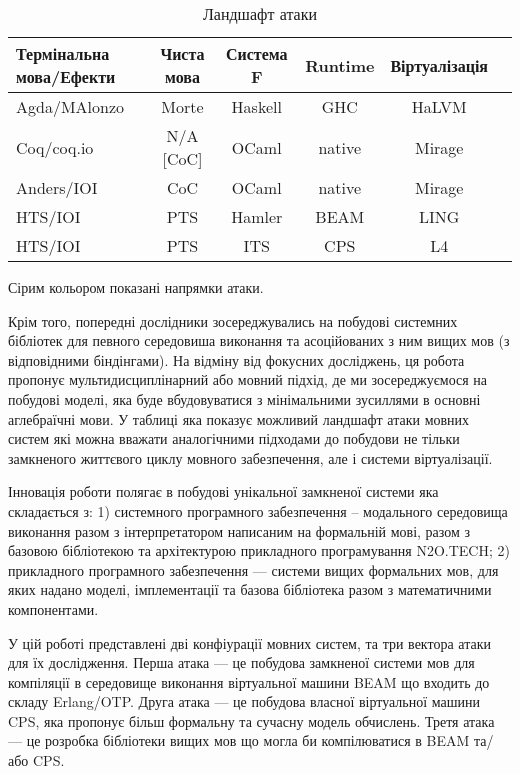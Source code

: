 \begin{table}
 \caption{Ландшафт атаки}
  \begin{tabular}{lccccc}
    \hline
       \textbf{Термінальна мова/Ефекти} & \textbf{Чиста мова} & \textbf{Система F} & \textbf{Runtime} & \textbf{Віртуалізація} \\
    \hline
 Agda/MAlonzo      & Morte     & Haskell & GHC    & HaLVM \\
 Coq/coq.io        & N/A [CoC] & OCaml   & native & Mirage \\
 Anders/IOI        & CoC       & OCaml   & native & Mirage \\
    \hline
    \rowcolor{LightGray}
 HTS/IOI           & PTS       & Hamler  & BEAM   & LING \\
    \hline
    \rowcolor{LightGray}
 HTS/IOI           & PTS       & ITS     & CPS    & L4 \\
    \hline
  \end{tabular}
  \small Сірим кольором показані напрямки атаки.
\end{table}

Крім того, попередні дослідники зосереджувались на побудові системних бібліотек для
певного середовиша виконання та асоційованих з ним вищих мов (з відповідними біндінгами).
На відміну від фокусних досліджень, ця робота пропонує мультидисциплінарний або мовний підхід,
де ми зосереджуємося на побудові моделі, яка буде вбудовуватися з мінімальними
зусиллями в основні аглебраїчні мови. У таблиці яка показує можливий ландшафт атаки
мовних систем які можна вважати аналогічними підходами до побудови не тільки замкненого
життєвого циклу мовного забезпечення, але і системи віртуалізації.

Інновація роботи полягає в побудові унікальної замкненої системи яка складається з:
1) системного програмного забезпечення -- модального середовища виконання разом з інтерпретатором
написаним на формальній мові, разом з базовою бібліотекою та архітектурою прикладного програмування N2O.TECH;
2) прикладного програмного забезпечення --- системи вищих формальних мов, для яких надано моделі,
імплементації та базова бібліотека разом з математичними компонентами.

У цій роботі представлені дві конфіурації мовних систем, та три вектора атаки для їх дослідження.
Перша атака --- це побудова замкненої системи мов для компіляції в середовище виконання віртуальної машини BEAM що входить до складу Erlang/OTP.
Друга атака --- це побудова власної віртуальної машини CPS, яка пропонує більш формальну та сучасну модель обчислень.
Третя атака --- це розробка бібліотеки вищих мов що могла би компілюватися в BEAM та/або CPS.\\

